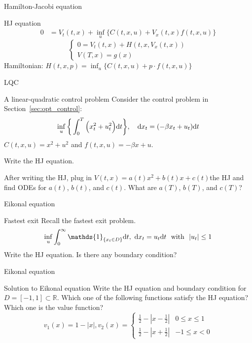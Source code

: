 \documentclass[color=usenames,dvipsnames]{beamer}
\newcommand{\dt}{\text{\normalfont d}t}
\newcommand{\dx}{\text{\normalfont d}x}
\begin{document}
\begin{frame}{Hamilton-Jacobi equation}
    \begin{block}
        {HJ equation}
\[
\begin{split}
    0 & = V_t(t,x) +\inf_{u}\Big\{C(t,x,u) + V_x(t,x)  f(t,x,u) \Big\}
\end{split}
\]
\[
\begin{cases}
    0  = V_t(t,x) + H(t,x,V_x(t,x))\\
    V(T,x)=g(x)
\end{cases}
\]
Hamiltonian: 
$H(t,x,p)= \inf_{u}\Big\{C(t,x,u) + p\cdot   f(t,x,u) \Big\}$
    \end{block}
\end{frame}
\begin{frame}{LQC}
    \begin{block}
        {A linear-quadratic control problem}
        Consider the control problem in Section~\ref{sec:opt_control}:
\begin{equation}
\inf_{u}\bigg\{\int_0^T\Big(x_t^2 +u_t^2\Big) {{\dt}}\bigg\},~~~{\dx}_t = (-\beta x_t + u_t ){{\dt}}
\end{equation}
$C(t,x,u)=x^2 + u^2$ and $f(t,x,u)=-\beta x + u$.

Write the HJ  equation. 

After writing the HJ, plug in $V(t,x)=a(t)x^2+b(t)x+c(t)$the HJ and find ODEs for $a(t)$, $b(t)$, and $c(t)$. What are $a(T)$, $b(T)$, and $c(T)$?
    \end{block}
\end{frame}

\begin{frame}{Eikonal equation}
    \begin{block}
        {Fastest exit}
        Recall the fastest exit problem.
        \[
        \inf_u\int_0^\infty \mathds{1}_{\{x_t\in D\}}{\dt},~{\dx}_t=u_t{{\dt}}~\text{ with }~|u_t|\le1
        \]
        Write the HJ equation. Is there any boundary condition?
    \end{block}
\end{frame}
\begin{frame}{Eikonal equation}
    \begin{block}
        {Solution to Eikonal equation}
        Write the HJ equation and boundary condition for $D=[-1,1]\subset\mathbb{R}$. Which one of the following functions satisfy the HJ equation? Which one is the value function?
        \[
        v_1(x) = 1-|x|, v_2(x)= \begin{cases}
            \frac12-|x-\frac12|&0\le x\le1\\
            \frac12-|x+\frac12|&-1\le x<0
        \end{cases}
        \]
    \end{block}
\end{frame}
\end{document}
